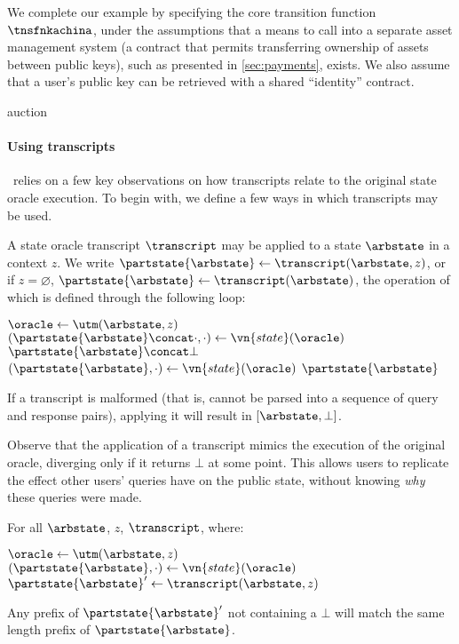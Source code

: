 We complete our example by specifying the core transition function $\tnsfnkachina$,
under the assumptions that a means to call into a separate asset management
system (a contract that permits transferring ownership of assets between public
keys), such as presented in \iffull\autoref{sec:payments}\else\cite[Appendix~J.4]{fullversion}\fi, exists. We also assume that
a user's public key can be retrieved with a shared ``identity'' contract.

{auction}


\paragraph{Using transcripts}
\kachina\ relies on a few key observations on how transcripts relate to the
original state oracle execution. To begin with, we define a few ways in which
transcripts may be used.
\begin{definition}
  A state oracle transcript $\transcript$ may be applied to a state $\arbstate$
  in a context $z$. We write $\partstate{\arbstate} \gets \transcript(\arbstate, z)$, or if
  $z = \varnothing$, $\partstate{\arbstate} \gets \transcript(\arbstate)$, the operation of
  which is defined through the following loop:
  \begin{algorithmic}
      \State \Let $\oracle \gets \utm(\arbstate, z)$
        \State {}
          \State \Let $(\partstate{\arbstate} \concat \cdot, \cdot) \gets \vn{state}(\oracle)$
          \State \Return $\partstate{\arbstate} \concat \bot$
        \EndIf
      \EndFor
      \State \Let $(\partstate{\arbstate}, \cdot) \gets \vn{state}(\oracle)$
      \State \Return $\partstate{\arbstate}$
    \EndFunction
  \end{algorithmic}
  If a transcript is malformed (that is, cannot be parsed into a sequence of
  query and response pairs), applying it will result in $[\arbstate, \bot]$.
\end{definition}

Observe that the application of a transcript mimics the execution of the
original oracle, diverging only if it returns $\bot$ at some point.
This allows users to replicate the effect other users' queries
have on the public state, without knowing \emph{why} these queries were made.

\begin{lemma}
  For all $\arbstate$, $z$, $\transcript$, where:
  \begin{algorithmic}
    \State \Let $\oracle \gets \utm(\arbstate, z)$
      \State {}
    \EndFor
    \State \Let $(\partstate{\arbstate}, \cdot) \gets \vn{state}(\oracle)$
    \State \Let $\partstate{\arbstate}' \gets \transcript(\arbstate, z)$
  \end{algorithmic}
  Any prefix of $\partstate{\arbstate}'$ not containing a $\bot$ will match the
  same length prefix of $\partstate{\arbstate}$.
\end{lemma}

